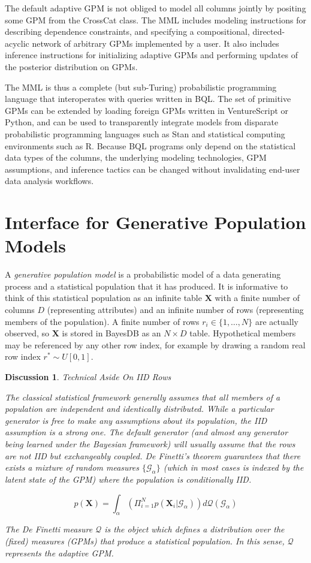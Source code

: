 \documentclass[10pt,letterpaper]{article}
\newtheorem{discussion}{Discussion}[section]
\newcommand{\set}[1]{\{#1\}}
\newcommand{\G}{\mathcal{G}}
\begin{document}
The default adaptive GPM is not obliged to model all columns jointly by
positing some GPM from the CrossCat class. The MML includes modeling
instructions for describing dependence constraints, and specifying a
compositional, directed-acyclic network of arbitrary GPMs implemented by a user.
It also includes inference instructions for initializing adaptive GPMs and
performing updates of the posterior distribution on GPMs.

The MML is thus a complete (but sub-Turing) probabilistic programming language
that interoperates with queries written in BQL. The set of primitive GPMs can be
extended by loading foreign GPMs written in VentureScript or Python, and can be used to
transparently integrate models from disparate probabilistic programming
languages such as Stan and statistical computing environments such as R. Because
BQL programs only depend on the statistical data types of the columns, the
underlying modeling technologies, GPM assumptions, and inference tactics can be
changed without invalidating end-user data analysis workflows.

\section{Interface for Generative Population Models} \label{sec:generators}
A \textit{generative population model} is a probabilistic model of a data
generating process and a statistical population that it has produced. It is
informative to think of this statistical population as an infinite table
$\mathbf{X}$ with a finite number of columns $D$ (representing attributes) and
an infinite number of rows (representing members of the population). A finite
number of rows $r_i \in
\set{1,\dots,N}$ are actually observed, so $\mathbf{X}$ is stored in BayesDB as
an $N \times D$ table. Hypothetical members may be referenced by any other row index,
for example by drawing a random real row index
$r^*\sim U[0,1]$.

\begin{discussion} \label{disc:iid} Technical Aside On IID Rows

The classical statistical framework generally assumes that all members of a
population are independent and identically distributed. While a particular
generator is free to make any assumptions about its population, the IID
assumption is a strong one. The default generator (and almost any generator
being learned under the Bayesian framework) will usually assume that the rows
are not IID but exchangeably coupled. De Finetti's theorem guarantees that there
exists a mixture of random measures $\set{\G_\alpha}$ (which in most
cases is indexed by the latent state of the GPM) where the population is
conditionally IID.

$$p(\mathbf{X}) = \int_\alpha{(\Pi_{i=1}^Np(\mathbf{X}_i|\G_\alpha))d
\mathcal{Q}(\G_\alpha)}$$

The De Finetti measure $\mathcal{Q}$ is the object which defines a distribution
over the (fixed) measures (GPMs) that produce a statistical population. In this
sense, $\mathcal{Q}$ represents the adaptive GPM.

\end{discussion}
\end{document}
